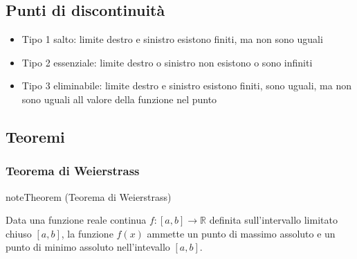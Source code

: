 \documentclass[letterpaper,10pt,italian]{jupyterBook}
\begin{document}
\subsection{Punti di discontinuità}
\label{\detokenize{ch/infinitesimal_calculus/analysis:punti-di-discontinuita}}\label{\detokenize{ch/infinitesimal_calculus/analysis:infinitesimal-calculus-continuous-fun-disc}}\begin{itemize}
\item {} 
\sphinxAtStartPar
Tipo 1 \sphinxhyphen{} salto: limite destro e sinistro esistono finiti, ma non sono uguali

\item {} 
\sphinxAtStartPar
Tipo 2 \sphinxhyphen{} essenziale: limite destro o sinistro non esistono o sono infiniti

\item {} 
\sphinxAtStartPar
Tipo 3 \sphinxhyphen{} eliminabile: limite destro e sinistro esistono finiti, sono uguali, ma non sono uguali all valore della funzione nel punto

\end{itemize}

\sphinxAtStartPar
{} 


\subsection{Teoremi}
\label{\detokenize{ch/infinitesimal_calculus/analysis:teoremi}}\label{\detokenize{ch/infinitesimal_calculus/analysis:infinitesimal-calculus-continuous-fun-thms}}

\subsubsection{Teorema di Weierstrass}
\label{\detokenize{ch/infinitesimal_calculus/analysis:teorema-di-weierstrass}}\label{\detokenize{ch/infinitesimal_calculus/analysis:infinitesimal-calculus-continuous-fun-thms-weierstrass}}\label{None:thm:infinitesimal-calculus:continuous-fun:thms:weierstrass}
\begin{sphinxadmonition}{note}{Theorem  (Teorema di Weierstrass)}



\sphinxAtStartPar
Data una funzione reale continua \(f: [a,b] \rightarrow \mathbb{R}\) definita sull’intervallo limitato chiuso \([a,b]\), la funzione \(f(x)\) ammette un punto di massimo assoluto e un punto di minimo assoluto nell’intevallo \([a,b]\).
\end{sphinxadmonition}
\end{document}
